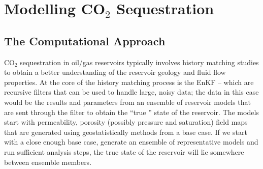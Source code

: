\documentclass{acm_proc_article-sp}
\newcommand{\up}{\vspace*{-0.3em}}
\newcommand{\jhanote}[1]{ {\textcolor{red} { ***Jha: #1 }}}
\newcommand{\yyenote}[1]{ {\textcolor{blue} { ***yye00: #1 }}}
\newcommand{\jhanote}[1]{}
\newcommand{\yyenote}[1]{}
\begin{document}


\up\up
\section{Modelling CO$_2$ Sequestration}


\up
\subsection{The Computational Approach}
\up 

CO$_2$ sequestration in oil/gas reservoirs typically involves
history matching studies to obtain a better understanding of the
reservoir geology and fluid flow properties.  At the core of the
history matching process is the EnKF -- which are recursive filters
that can be used to handle large, noisy data; the data in this case
would be the results and parameters from an ensemble of reservoir models
that are sent through the filter to obtain the ``true '' state of the
reservoir. The models start with permeability, porosity (possibly
pressure and saturation) field maps that are generated using
geostatistically methods from a base case. If we start with a
close enough base case, generate an ensemble of representative models
and run sufficient analysis steps, the true state of the reservoir
will lie somewhere between ensemble members.
\end{document}
